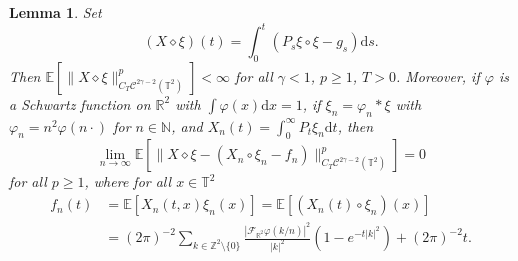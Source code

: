 \documentclass[a4paper,11pt]{article}
\newcommand{\mathd}{\mathrm{d}}
\newtheorem{lemma}{Lemma}
{\theorembodyfont{\rmfamily}\newtheorem{remark}{Remark}}
\newcommand{\CF}{\mathscr{F}}
\newcommand{\CC}{\mathscr{C}}
\newcommand{\reso}{\,\mathord{\circ}\,}
\newcommand{\renorm}{\,\mathord{\diamond}\,}
\begin{document}
\begin{lemma}
  \label{lem:pam area}Set
  \[ (X \renorm \xi) (t) = \int_0^t (P_s \xi \reso \xi - g_s) \mathd s. \]
  Then $\mathbb{E} [\|X \renorm \xi \|_{C_T \CC^{2 \gamma - 2}
  (\mathbb{T}^2)}^p] < \infty$ for all $\gamma < 1$, $p \ge 1$, $T > 0$.
  Moreover, if $\varphi$ is a Schwartz function on $\mathbb{R}^2$ with $\int
  \varphi (x) \mathd x = 1$, if $\xi_n = \varphi_n \ast \xi$ with $\varphi_n =
  n^2 \varphi (n \cdot)$ for $n \in \mathbb{N}$, and $X_n (t) =
  \int_0^{\infty} P_t \xi_n \mathd t$, then
  \[ \lim_{n \rightarrow \infty} \mathbb{E} [\|X \renorm \xi - (X_n \reso
     \xi_n - f_n)\|_{C_T \CC^{2 \gamma - 2} (\mathbb{T}^2)}^p] = 0 \]
  for all $p \ge 1$, where for all $x \in \mathbb{T}^2$
  \begin{align*}
    f_n (t) & =  \mathbb{E} [X_n (t, x) \xi_n (x)] =\mathbb{E} [(X_n (t)
    \reso \xi_n) (x)]  \\
    & =  (2 \pi)^{- 2} \sum_{k \in \mathbb{Z}^2 \setminus \{ 0 \}} \frac{|
    \CF_{\mathbb{R}^2} \varphi (k / n) |^2}{|k|^2} (1 - e^{- t | k |^2}) + (2
    \pi)^{- 2} t.  
  \end{align*}
\end{lemma}
\end{document}
